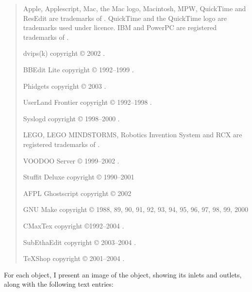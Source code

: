 \begin{quote}
\begin{small}
Apple, Applescript, Mac, the Mac logo, Macintosh, MPW, QuickTime and ResEdit are trademarks of
.
QuickTime and the QuickTime logo are trademarks used under licence.
IBM and PowerPC are registered trademarks of .

dvips(k) copyright \copyright{} 2002 .

BBEdit Lite copyright \copyright{} 1992--1999 .

Phidgets copyright \copyright{} 2003 .

UserLand Frontier copyright \copyright{} 1992--1998 .

Syslogd copyright \copyright{} 1998--2000 .

LEGO, LEGO MINDSTORMS, Robotics Invention System and RCX are registered trademarks of
.

VOODOO Server \copyright{} 1999--2002 .

Stuffit Deluxe copyright \copyright{} 1990--2001 

AFPL Ghostscript copyright \copyright{} 2002 

GNU Make copyright \copyright{} 1988, 89, 90, 91, 92, 93, 94, 95, 96, 97, 98, 99, 2000


CMaxTex copyright \copyright 1992--2004 .

SubEthaEdit copyright \copyright{} 2003--2004 .

TeXShop copyright \copyright{} 2001--2004 .

\end{small}
\end{quote}
For each object, I present an image of the object, showing its inlets and outlets, along with the following text entries:
